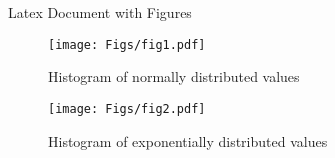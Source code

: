 \documentclass[12pt]{article}
\begin{document}
\huge{Latex Document with Figures}
\begin{figure}[!p]
\centering\texttt{[image: Figs/fig1.pdf]}
\caption{Histogram of normally distributed values}
\label{Fig1}
\end{figure}

\begin{figure}[!p]
    \centering\texttt{[image: Figs/fig2.pdf]}
    \caption{Histogram of exponentially distributed values}
    \label{Fig1}
    \end{figure}
\end{document}
